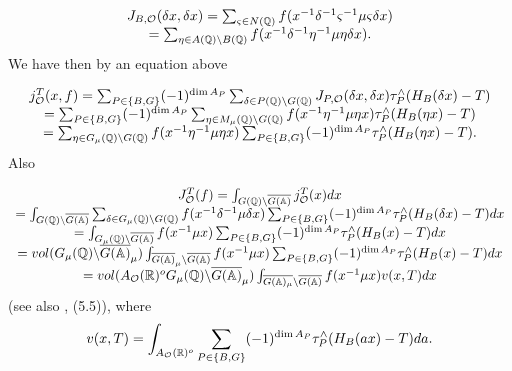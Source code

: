 \begin{equation}
\begin{array}{c}
J_{B,{\cal{O}}}(\delta x,\delta x)
=\sum_{\varsigma \in N( {\mathbb{Q}})}
f(x^{-1}\delta^{-1}\varsigma ^{-1}\mu \varsigma \delta x) \\ 
=\sum_{\eta \in A({\mathbb{Q}})\backslash B({\mathbb{Q}})}
f(x^{-1}\delta ^{-1}\eta^{-1}\mu \eta \delta x).
\end{array}
\end{equation}
We have then by an equation above

\begin{equation}
\begin{array}{c}
j_{\cal{O}}^T(x,f)
=\sum_{P\in \{B,G\}}(-1)^{\dim A_P}
\sum_{\delta \in P( {\mathbb{Q}})\backslash G({\mathbb{Q}})}
J_{P,{\cal{O}}}(\delta x,\delta x) \tau _P^{\wedge}(H_B(\delta x)-T) \\ 
=\sum_{P\in \{B,G\}}(-1)^{\dim A_P}
\sum_{\eta \in M_\mu ( {\mathbb{Q}})\backslash G({\mathbb{Q}})}
f(x^{-1}\eta ^{-1}\mu \eta x)\tau _P^{\wedge}(H_B(\eta x)-T) \\ 
=\sum_{\eta \in G_\mu ({\mathbb{Q}})\backslash G({\mathbb{Q}} )}
f(x^{-1}\eta ^{-1}\mu\eta x)
\sum_{P\in \{B,G\}}(-1)^{\dim A_P} \tau_P^{\wedge }(H_B(\eta x)-T).
\end{array}
\end{equation}
Also

\begin{equation}
\begin{array}{c}
J_{\cal{O}}^T(f)
=\int_{G({\mathbb{Q}})\backslash
\overline{G({\mathbb{A}})}}
j_{\cal{O}}^T(x)dx \\ 
=\int_{G({\mathbb{Q}})\backslash \overline{G({\mathbb{A}})}}
\sum_{\delta \in G_\mu ({\mathbb{Q}})\backslash G({\mathbb{Q}})}
f(x^{-1}\delta ^{-1}\mu \delta x)
\sum_{P\in\{B,G\}}(-1)^{\dim A_P}\tau _P^{\wedge }(H_B(\delta x)-T)dx \\ 
=\int_{G_\mu ({\mathbb{Q}})\backslash \overline{G({\mathbb{A}})}}
f(x^{-1}\mu x)\sum_{P\in\{B,G\}}(-1)^{\dim A_P}
\tau _P^{\wedge }(H_B(x)-T)dx \\ 
=vol(G_\mu ({\mathbb{Q}})\backslash \overline{G({\mathbb{A}})}_\mu)
\int_{\overline{G({\mathbb{A}})}_\mu\backslash \overline{G({\mathbb{A}})}}
f(x^{-1}\mu x)\sum_{P\in \{B,G\}}(-1)^{\dim A_P}
\tau_P^{\wedge }(H_B(x)-T)dx \\ 
=vol(A_{\cal{O}}({\mathbb{R}})^oG_\mu ({\mathbb{Q}})\backslash
\overline{G ({\mathbb{A}})}_\mu)
\int_{\overline{G ({\mathbb{A}})_\mu}\backslash \overline{G({\mathbb{A}})}}
f(x^{-1}\mu x)v(x,T)dx
\end{array}
\end{equation}
(see also \cite{Sho}, (5.5)), where 
\begin{equation}
v(x,T)=\int_{A_{\cal{O}}({\mathbb{R}})^o}
\sum_{P\in \{B,G\}}(-1)^{\dim A_P}\tau_P^{\wedge }(H_B(ax)-T)da.
\end{equation}

